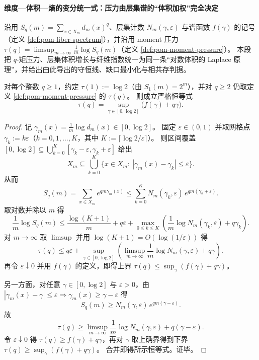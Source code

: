 
\paragraph{维度—体积—熵的变分统一式：压力由层集谱的“体积加权”完全决定}
沿用 \(S_q(m)=\sum_{x\in X_m}d_m(x)^q\)、层集计数 \(N_m(\gamma,\varepsilon)\) 与谱函数 \(f(\gamma)\) 的记号（定义 \ref{def:pom-fiber-spectrum}），并沿用 moment 压力
\(\tau(q)=\limsup_{m\to\infty}\frac1m\log S_q(m)\)（定义 \ref{def:pom-moment-pressure}）。
本段把 \(q\)-矩压力、层集体积增长与纤维指数统一为同一条“对数体积的 Laplace 原理”，并给出由此导出的守恒线、缺口最小化与相共存判据。

\begin{proposition}[变分统一式：\texorpdfstring{$\tau(q)=\sup_\gamma(f(\gamma)+q\gamma)$}{tau(q)=sup(f+qg)}]\label{prop:pom-variational-unity-tau-from-f}
对每个整数 \(q\ge 1\)，约定 \(\tau(1):=\log 2\)（由 \(S_1(m)=2^m\)），并对 \(q\ge 2\) 仍取定义 \ref{def:pom-moment-pressure} 的 \(\tau(q)\)。
则成立严格恒等式
\[
\boxed{\;
\tau(q)=\sup_{\gamma\in[0,\log 2]}\bigl(f(\gamma)+q\gamma\bigr).\;}
\]
\end{proposition}
\begin{proof}
记 \(\gamma_m(x)=\frac1m\log d_m(x)\in[0,\log 2]\)。
固定 \(\varepsilon\in(0,1)\) 并取网格点 \(\gamma_k:=k\varepsilon\)（\(k=0,1,\dots,K\)，其中 \(K:=\lceil \log 2/\varepsilon\rceil\)）。
则区间覆盖 \([0,\log 2]\subseteq\bigcup_{k=0}^{K}[\gamma_k-\varepsilon,\gamma_k+\varepsilon]\) 给出
\[
X_m\subseteq \bigcup_{k=0}^{K}\{x\in X_m:\ |\gamma_m(x)-\gamma_k|\le \varepsilon\}.
\]
从而
\[
S_q(m)=\sum_{x\in X_m}e^{qm\gamma_m(x)}
\le
\sum_{k=0}^{K}N_m(\gamma_k,\varepsilon)\,e^{qm(\gamma_k+\varepsilon)}.
\]
取对数并除以 \(m\) 得
\[
\frac1m\log S_q(m)
\le
\frac{\log(K+1)}{m}+q\varepsilon+\max_{0\le k\le K}\left(\frac1m\log N_m(\gamma_k,\varepsilon)+q\gamma_k\right).
\]
对 \(m\to\infty\) 取 \(\limsup\) 并用 \(\log(K+1)=O(\log(1/\varepsilon))\) 得
\[
\tau(q)\le q\varepsilon+\sup_{\gamma\in[0,\log 2]}\left(\limsup_{m\to\infty}\frac1m\log N_m(\gamma,\varepsilon)+q\gamma\right).
\]
再令 \(\varepsilon\downarrow 0\) 并用 \(f(\gamma)\) 的定义，即得上界
\(\tau(q)\le \sup_{\gamma}(f(\gamma)+q\gamma)\)。
\par
另一方面，对任意 \(\gamma\in[0,\log 2]\) 与 \(\varepsilon>0\)，由 \(|\gamma_m(x)-\gamma|\le\varepsilon\Rightarrow \gamma_m(x)\ge \gamma-\varepsilon\) 得
\[
S_q(m)\ge N_m(\gamma,\varepsilon)\,e^{qm(\gamma-\varepsilon)}.
\]
故
\[
\tau(q)\ge \limsup_{m\to\infty}\frac1m\log N_m(\gamma,\varepsilon)+q(\gamma-\varepsilon).
\]
令 \(\varepsilon\downarrow 0\) 得 \(\tau(q)\ge f(\gamma)+q\gamma\)，再对 \(\gamma\) 取上确界得到下界
\(\tau(q)\ge \sup_\gamma(f(\gamma)+q\gamma)\)。
合并即得所示恒等式。证毕。
\end{proof}

